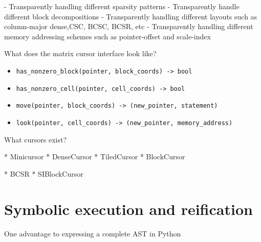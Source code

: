     - Transparently handling different sparsity patterns
        - Transparently handle different block decompositions
        - Transparently handling different layouts such as column-major dense,CSC, BCSC, BCSR, etc
        - Transparently handling different memory addressing schemes such as pointer-offset and scale-index


    What does the matrix cursor interface look like?

    \begin{itemize}
    \item \verb|has_nonzero_block(pointer, block_coords) -> bool|
    \item \verb|has_nonzero_cell(pointer, cell_coords) -> bool|
    \item \verb|move(pointer, block_coords) -> (new_pointer, statement)|
    \item \verb|look(pointer, cell_coords) -> (new_pointer, memory_address)|
    \end{itemize}


    What cursors exist?

    * Minicursor
    * DenseCursor
    * TiledCursor
    * BlockCursor
    
    * BCSR
    * SIBlockCursor

\section{Symbolic execution and reification}

One advantage to expressing a complete AST in Python

